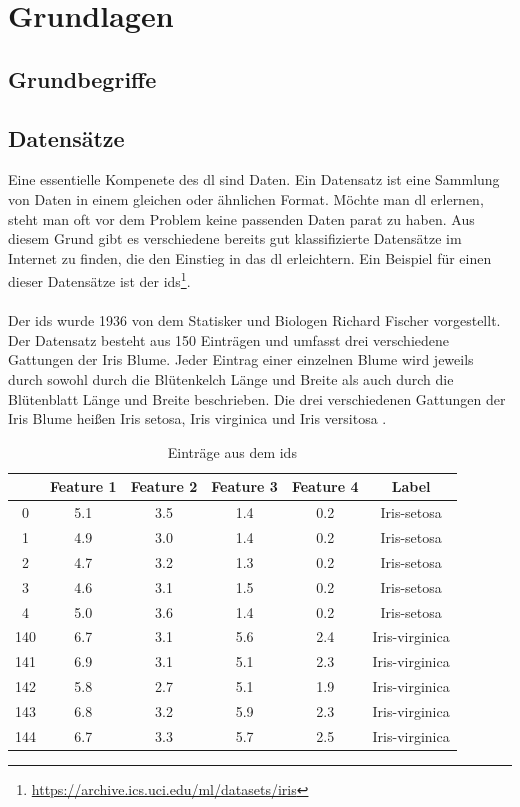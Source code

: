 \documentclass[conference, german]{IEEEtran}
\begin{document}
\section{Grundlagen}
\subsection{Grundbegriffe}
\subsection{Datensätze}
Eine essentielle Kompenete des \ac{dl} sind Daten.
Ein Datensatz ist eine Sammlung von Daten in einem gleichen oder ähnlichen Format.
Möchte man \ac{dl} erlernen, steht man oft vor dem Problem keine passenden Daten parat zu haben.
Aus diesem Grund gibt es verschiedene bereits gut klassifizierte Datensätze im Internet zu finden, die den Einstieg in das \ac{dl} erleichtern. 
Ein Beispiel für einen dieser Datensätze ist der \ac{ids}\footnote{\url{https://archive.ics.uci.edu/ml/datasets/iris}}.
\\\\
Der \ac{ids} wurde 1936 von dem Statisker und Biologen Richard Fischer vorgestellt.
Der Datensatz besteht aus 150 Einträgen und umfasst drei verschiedene Gattungen der Iris Blume.
Jeder Eintrag einer einzelnen Blume wird jeweils durch sowohl durch die Blütenkelch Länge und Breite als auch durch die Blütenblatt Länge und Breite beschrieben.
Die drei verschiedenen Gattungen der Iris Blume heißen Iris setosa, Iris virginica und Iris versitosa \citep[vgl.][]{WIKI01}.
\begin{table}
	\caption{Einträge aus dem \ac{ids}}
	\label{table:ids}
	\centering
	\begin{tabular}{c c c c c c}
	\toprule
	{} &    Feature 1 & Feature 2 & Feature 3 & Feature 4 & Label \\
	\midrule
	0 &  5.1 &  3.5 &  1.4 &  0.2 &  Iris-setosa \\
	1 &  4.9 &  3.0 &  1.4 &  0.2 &  Iris-setosa \\
	2 &  4.7 &  3.2 &  1.3 &  0.2 &  Iris-setosa \\
	3 &  4.6 &  3.1 &  1.5 &  0.2 &  Iris-setosa \\
	4 &  5.0 &  3.6 &  1.4 &  0.2 &  Iris-setosa \\
	\midrule
	140 &  6.7 &  3.1 &  5.6 &  2.4 &  Iris-virginica \\
	141 &  6.9 &  3.1 &  5.1 &  2.3 &  Iris-virginica \\
	142 &  5.8 &  2.7 &  5.1 &  1.9 &  Iris-virginica \\
	143 &  6.8 &  3.2 &  5.9 &  2.3 &  Iris-virginica \\
	144 &  6.7 &  3.3 &  5.7 &  2.5 &  Iris-virginica \\
	\bottomrule
\end{tabular}
\end{table}
\end{document}
